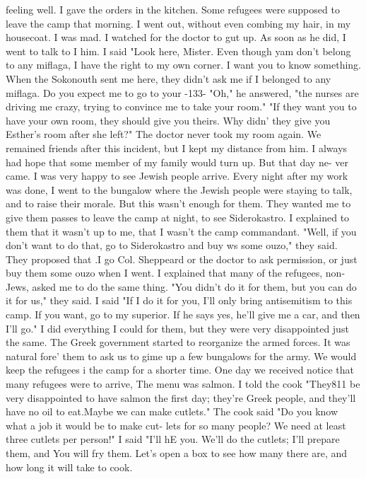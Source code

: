 feeling well.
I gave the orders in the kitchen.
Some refugees were supposed to leave 
the camp that morning.
I went out, without even combing my hair, in my housecoat.
I 
was mad.
I watched for the doctor to gut up.
As soon as he did, I went to talk to 
I 
him.
I said "Look here, Mister.
Even though yam don't belong to any miflaga, I have 
the right to my own corner.
I want you to know something.
When the Sokonouth sent me 
here, they didn't ask me if I belonged to any miflaga.
Do you expect me to go to your 
-133- 
"Oh," he answered, "the nurses are driving me crazy, trying to convince me to 
take your room."
"If they want you to have your own room, they should give you theirs.
Why didn' 
they give you Esther's room after she left?"
The doctor never took my room again.
We 
remained friends after this incident, but I kept my distance from him.
I always had hope that some member of my family would turn up.
But that day ne-
ver came.
I was very happy to see Jewish people arrive.
Every night after my work 
was done, I went to the bungalow where the Jewish people were staying to talk, and to 
raise their morale.
But this wasn't enough for them.
They wanted me to give them 
passes to leave the camp at night, to see Siderokastro.
I explained to them that it 
wasn't up to me, that I wasn't the camp commandant.
"Well, if you don't want to do 
that, go to Siderokastro and buy ws some ouzo," they said.
They proposed that .I go 
Col.
Sheppeard or the doctor to ask permission, or just buy them some ouzo when I 
went.
I explained that many of the refugees, non-Jews, asked me to do the same thing.
"You didn't do it for them, but you can do it for us," they said.
I said "If I do it 
for you, I'll only bring antisemitism to this camp.
If you want, go to my superior.
If he says yes, he'll give me a car, and then I'll go."
I did everything I could for 
them, but they were very disappointed just the same.
The Greek government started to reorganize the armed forces.
It was natural fore' 
them to ask us to gime up a few bungalows for the army.
We would keep the refugees i 
the camp for a shorter time.
One day we received notice that many refugees were to 
arrive, The menu was salmon.
I told the cook "They811 be very disappointed to have 
salmon the first day; they're Greek people, and they'll have no oil to eat.Maybe we 
can make cutlets."
The cook said "Do you know what a job it would be to make cut-
lets for so many people?
We need at least three cutlets per person!"
I said "I'll hE 
you.
We'll do the cutlets; I'll prepare them, and You will fry them.
Let's open a 
box to see how many there are, and how long it will take to cook.
